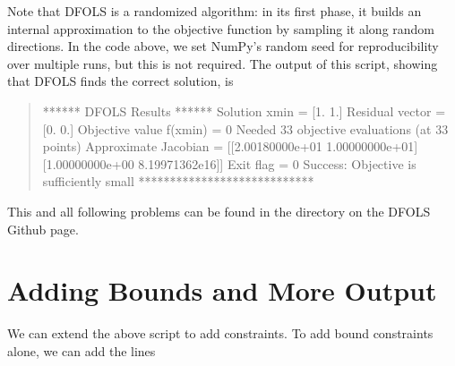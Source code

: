 \documentclass[letterpaper,10pt,english]{sphinxmanual}
\begin{document}
\sphinxAtStartPar
Note that DFO\sphinxhyphen{}LS is a randomized algorithm: in its first phase, it builds an internal approximation to the objective function by sampling it along random directions. In the code above, we set NumPy’s random seed for reproducibility over multiple runs, but this is not required. The output of this script, showing that DFO\sphinxhyphen{}LS finds the correct solution, is
\begin{quote}

\begin{sphinxVerbatim}[commandchars=\\\{\}]
****** DFO\PYGZhy{}LS Results ******
Solution xmin = [1. 1.]
Residual vector = [0. 0.]
Objective value f(xmin) = 0
Needed 33 objective evaluations (at 33 points)
Approximate Jacobian = [[\PYGZhy{}2.00180000e+01  1.00000000e+01]
 [\PYGZhy{}1.00000000e+00  8.19971362e\PYGZhy{}16]]
Exit flag = 0
Success: Objective is sufficiently small
****************************
\end{sphinxVerbatim}
\end{quote}

\sphinxAtStartPar
This and all following problems can be found in the  directory on the DFO\sphinxhyphen{}LS Github page.


\section{Adding Bounds and More Output}
\label{\detokenize{userguide:adding-bounds-and-more-output}}
\sphinxAtStartPar
We can extend the above script to add constraints. To add bound constraints alone, we can add the lines
\begin{quote}

\begin{sphinxVerbatim}[commandchars=\\\{\}]
  \PYG{p}{[} \PYG{p}{]}
  \PYG{p}{[} \PYG{p}{]}

     
\end{sphinxVerbatim}
\end{quote}
\end{document}
